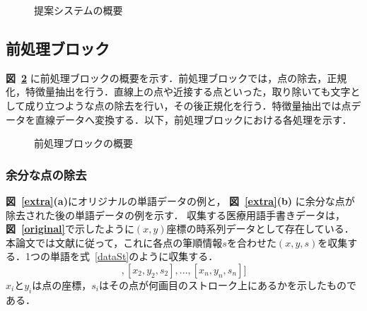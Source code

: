 \begin{figure}[tb]
 \begin{center}
  \caption{提案システムの概要}
  \label{sys_concept}
\end{center}
\end{figure}

\subsection{前処理ブロック}
\label{preprocess}
\textbf{図~\ref{preprocess}} に前処理ブロックの概要を示す．前処理ブロックでは，点の除去，正規化，特徴量抽出を行う．直線上の点や近接する点といった，取り除いても文字として成り立つような点の除去を行い，その後正規化を行う．特徴量抽出では点データを直線データへ変換する．以下，前処理ブロックにおける各処理を示す．

\begin{figure}[tb]
 \begin{center}
  \caption{前処理ブロックの概要}
  \label{preprocess}
\end{center}
\end{figure}

\subsubsection{余分な点の除去}
\label{remove_points}
\textbf{図~\ref{extra}(a)}にオリジナルの単語データの例と， \textbf{図~\ref{extra}(b)} に余分な点が除去された後の単語データの例を示す．
収集する医療用語手書きデータは，\textbf{図~\ref{original}}で示したように$(x, y)$座標の時系列データとして存在している．本論文では文献\cite{zhang18:drawing}に従って，これに各点の筆順情報$s$を合わせた$(x, y, s)$を収集する．1つの単語を式~\ref{dataSt}のように収集する．
\begin{equation}
 [[x_1, y_1, s_1], [x_2, y_2, s_2],..., [x_n, y_n, s_n]]
 \label{dataSt}
\end{equation}
$x_i$と$y_i$は点の座標，$s_i$はその点が何画目のストローク上にあるかを示したものである．

